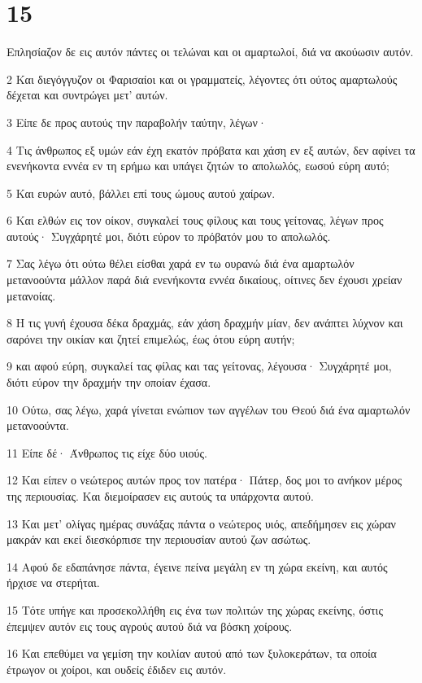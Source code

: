 \chapter{15}

\par Επλησίαζον δε εις αυτόν πάντες οι τελώναι και οι αμαρτωλοί, διά να ακούωσιν αυτόν.
\par 2 Και διεγόγγυζον οι Φαρισαίοι και οι γραμματείς, λέγοντες ότι ούτος αμαρτωλούς δέχεται και συντρώγει μετ' αυτών.
\par 3 Είπε δε προς αυτούς την παραβολήν ταύτην, λέγων·
\par 4 Τις άνθρωπος εξ υμών εάν έχη εκατόν πρόβατα και χάση εν εξ αυτών, δεν αφίνει τα ενενήκοντα εννέα εν τη ερήμω και υπάγει ζητών το απολωλός, εωσού εύρη αυτό;
\par 5 Και ευρών αυτό, βάλλει επί τους ώμους αυτού χαίρων.
\par 6 Και ελθών εις τον οίκον, συγκαλεί τους φίλους και τους γείτονας, λέγων προς αυτούς· Συγχάρητέ μοι, διότι εύρον το πρόβατόν μου το απολωλός.
\par 7 Σας λέγω ότι ούτω θέλει είσθαι χαρά εν τω ουρανώ διά ένα αμαρτωλόν μετανοούντα μάλλον παρά διά ενενήκοντα εννέα δικαίους, οίτινες δεν έχουσι χρείαν μετανοίας.
\par 8 Η τις γυνή έχουσα δέκα δραχμάς, εάν χάση δραχμήν μίαν, δεν ανάπτει λύχνον και σαρόνει την οικίαν και ζητεί επιμελώς, έως ότου εύρη αυτήν;
\par 9 και αφού εύρη, συγκαλεί τας φίλας και τας γείτονας, λέγουσα· Συγχάρητέ μοι, διότι εύρον την δραχμήν την οποίαν έχασα.
\par 10 Ούτω, σας λέγω, χαρά γίνεται ενώπιον των αγγέλων του Θεού διά ένα αμαρτωλόν μετανοούντα.
\par 11 Είπε δέ· Άνθρωπος τις είχε δύο υιούς.
\par 12 Και είπεν ο νεώτερος αυτών προς τον πατέρα· Πάτερ, δος μοι το ανήκον μέρος της περιουσίας. Και διεμοίρασεν εις αυτούς τα υπάρχοντα αυτού.
\par 13 Και μετ' ολίγας ημέρας συνάξας πάντα ο νεώτερος υιός, απεδήμησεν εις χώραν μακράν και εκεί διεσκόρπισε την περιουσίαν αυτού ζων ασώτως.
\par 14 Αφού δε εδαπάνησε πάντα, έγεινε πείνα μεγάλη εν τη χώρα εκείνη, και αυτός ήρχισε να στερήται.
\par 15 Τότε υπήγε και προσεκολλήθη εις ένα των πολιτών της χώρας εκείνης, όστις έπεμψεν αυτόν εις τους αγρούς αυτού διά να βόσκη χοίρους.
\par 16 Και επεθύμει να γεμίση την κοιλίαν αυτού από των ξυλοκεράτων, τα οποία έτρωγον οι χοίροι, και ουδείς έδιδεν εις αυτόν.

